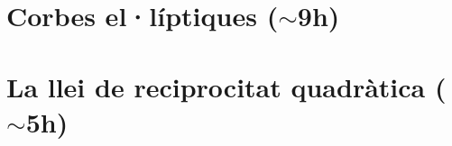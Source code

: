 \documentclass[11pt,fleqn]{book} %
\newcounter{let} \setcounter{let}{0}
\renewcommand{\1}{\mathbf{1}}
\newcommand{\0}{\mathbf{0}}
\begin{document}
\chapter{Corbes el·líptiques (\texorpdfstring{$\sim$9h}{})}
{
\let\paragraph\subsubsection
\let\subsubsection\subsection
\let\subsection\section

}
\chapter{La llei de reciprocitat quadràtica (\texorpdfstring{$\sim$5h}{})}
{
\let\paragraph\subsubsection
\let\subsubsection\subsection
\let\subsection\section


}
\end{document}
